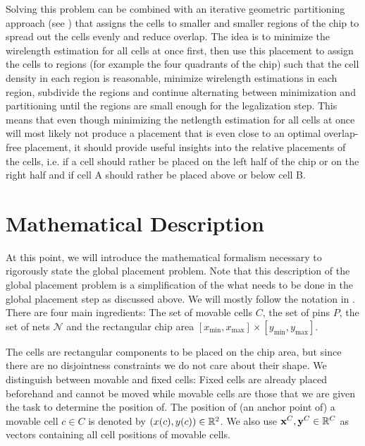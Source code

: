 Solving this problem can be combined with an iterative geometric partitioning approach (see \cite[pp. 12-16]{BrennerVygen-AnalyticalMethodsInVlsiPlacement})
that assigns the cells to smaller and smaller regions of the chip to spread out the cells evenly and reduce overlap.
The idea is to minimize the wirelength estimation for all cells at once first,
then use this placement to assign the cells to regions (for example the four quadrants of the chip) such that the cell density in each region is reasonable,
minimize wirelength estimations in each region, subdivide the regions
and continue alternating between minimization and partitioning until the regions are small enough
for the legalization step.
This means that even though minimizing the netlength estimation for all cells at once will most likely not produce
a placement that is even close to an optimal overlap-free placement,
it should provide useful insights into the relative placements
of the cells, i.e. if a cell should rather be placed on the left half of the chip or on the right half
and if cell A should rather be placed above or below cell B.

\section{Mathematical Description} \label{sec:mathematical_description}

At this point, we will introduce the mathematical formalism necessary to rigorously state the global placement problem.
Note that this description of the global placement problem is a simplification of the what needs to be done in the global placement step as discussed above.
We will mostly follow the notation in \cite{BrennerVygen-AnalyticalMethodsInVlsiPlacement}. 
There are four main ingredients: The set of movable cells \(C\), the set of pins \(P\), the set of nets \(\mathcal{N}\) and the rectangular chip area \([x_{\min}, x_{\max}] \times [y_{\min}, y_{\max}]\).

The cells are rectangular components to be placed on the chip area, but since there are no disjointness constraints we do not care about their shape.
We distinguish between movable and fixed cells: 
Fixed cells are already placed beforehand and cannot be moved
while movable cells are those that we are given the task to determine the position of.
The position of (an anchor point of) a movable cell \(c \in C\) is denoted by \((x(c), y(c)) \in \mathbb{R}^2\).
We also use \(\mathbf{x}^C, \mathbf{y}^C \in \mathbb{R}^C\) as vectors containing all cell positions of movable cells.

